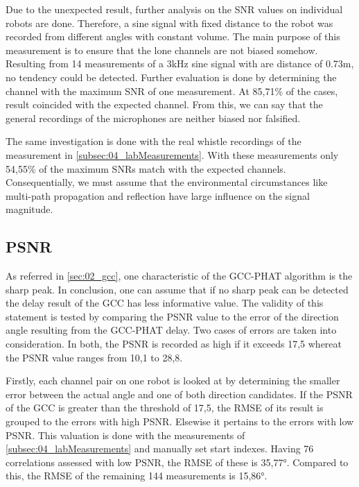Due to the unexpected result, further analysis on the \ac{SNR} values
on individual robots are done.
Therefore, a sine signal with fixed distance to the robot
was recorded from different angles with constant volume.
The main purpose of this measurement is to ensure that the lone channels
are not biased somehow.
Resulting from 14 measurements of a 3\si{\kilo\hertz} sine signal
with are distance of 0.73\si{m}, no tendency could be detected.
Further evaluation is done by determining the channel with the maximum
\ac{SNR} of one measurement. At 85,71\si{\percent} of the cases,
result coincided with the expected channel.
From this, we can say that the general recordings of the microphones
are neither biased nor falsified.

The same investigation is done with the real whistle recordings of the
measurement in \ref{subsec:04_labMeasurements}.
With these measurements only 54,55\si{\percent} of the maximum \acp{SNR}
match with the expected channels.
Consequentially, we must assume that the environmental circumstances
like multi-path propagation and reflection have large influence
on the signal magnitude.

\subsection{PSNR}
\label{subsec:04_psnr}

As referred in \cref{sec:02_gcc}, one characteristic of the \ac{GCC-PHAT}
algorithm is the sharp peak.
In conclusion, one can assume that if no sharp peak can be detected the
delay result of the \ac{GCC} has less informative value.
The validity of this statement is tested by comparing the \ac{PSNR} value
to the error of the direction angle resulting from the \ac{GCC-PHAT} delay.
Two cases of errors are taken into consideration.
In both, the \ac{PSNR} is recorded as high if it exceeds 17,5 whereat the
\ac{PSNR} value ranges from 10,1 to 28,8.

Firstly, each channel pair on one robot is looked at by determining the
smaller error between the actual angle and one of both direction candidates.
If the \ac{PSNR} of the \ac{GCC} is greater than the threshold of 17,5,
the \ac{RMSE} of its result is grouped to the errors with high \ac{PSNR}.
Elsewise it pertains to the errors with low \ac{PSNR}.
This valuation is done with the measurements of \cref{subsec:04_labMeasurements}
and manually set start indexes.
Having 76 correlations assessed with low \ac{PSNR}, the \ac{RMSE} of these
is 35,77\si{\degree}.
Compared to this, the \ac{RMSE} of the remaining 144 measurements
is 15,86\si{\degree}.

